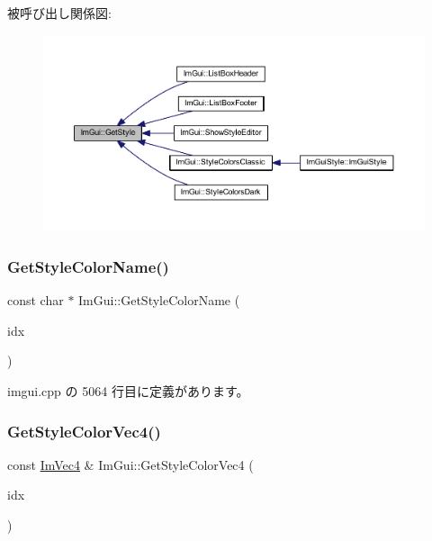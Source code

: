 被呼び出し関係図\+:\nopagebreak
\begin{figure}[H]
\begin{center}
\leavevmode
\includegraphics[width=350pt]{namespace_im_gui_abafef4bb3e3654efd96a47b2e22870a7_icgraph}
\end{center}
\end{figure}
\mbox{\label{namespace_im_gui_a265d7614c4c0b92ba6dd43946a3293e0}} 
\subsubsection{\texorpdfstring{Get\+Style\+Color\+Name()}{GetStyleColorName()}}
{\footnotesize\ttfamily const char $\ast$ Im\+Gui\+::\+Get\+Style\+Color\+Name (\begin{DoxyParamCaption}\item[{\mbox{\hyperlink{imgui_8h_a1b0467ec582e731ae6292fef726fb5fe}{Im\+Gui\+Col}}}]{idx }\end{DoxyParamCaption})}



 imgui.\+cpp の 5064 行目に定義があります。

\mbox{\label{namespace_im_gui_ad838e580972e2c4b3da2b0f60754b662}} 
\subsubsection{\texorpdfstring{Get\+Style\+Color\+Vec4()}{GetStyleColorVec4()}}
{\footnotesize\ttfamily const \mbox{\hyperlink{struct_im_vec4}{Im\+Vec4}} \& Im\+Gui\+::\+Get\+Style\+Color\+Vec4 (\begin{DoxyParamCaption}\item[{\mbox{\hyperlink{imgui_8h_a1b0467ec582e731ae6292fef726fb5fe}{Im\+Gui\+Col}}}]{idx }\end{DoxyParamCaption})}



